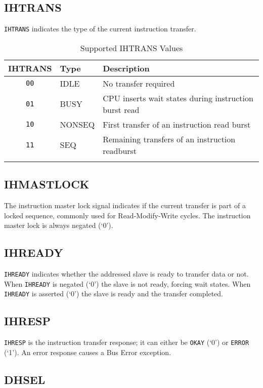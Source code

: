 \subsection{IHTRANS}\label{ihtrans}

\texttt{IHTRANS} indicates the type of the current instruction transfer.

\begin{longtable}[]{@{}cll@{}}
\toprule
IHTRANS & Type & Description\tabularnewline
\midrule
\endhead
\texttt{00} & IDLE & No transfer required\tabularnewline
\texttt{01} & BUSY & CPU inserts wait states during instruction burst read\tabularnewline
\texttt{10} & NONSEQ & First transfer of an instruction read burst\tabularnewline
\texttt{11} & SEQ & Remaining transfers of an instruction readburst\tabularnewline
\bottomrule
\caption{Supported IHTRANS Values}
\label{tab:ihtrans-values}
\end{longtable}

\subsection{IHMASTLOCK}\label{ihmastlock}

The instruction master lock signal indicates if the current transfer is
part of a locked sequence, commonly used for Read-Modify-Write cycles.
The instruction master lock is always negated (`0').

\subsection{IHREADY}\label{ihready}

\texttt{IHREADY} indicates whether the addressed slave is ready to transfer data
or not. When \texttt{IHREADY} is negated (`0') the slave is not ready, forcing
wait states. When \texttt{IHREADY} is asserted (`0') the slave is ready and the
transfer completed.

\subsection{IHRESP}\label{ihresp}

\texttt{IHRESP} is the instruction transfer response; it can either be \texttt{OKAY} (`0')
or \texttt{ERROR} (`1'). An error response causes a Bus Error exception.

\subsection{DHSEL}\label{dhsel}

